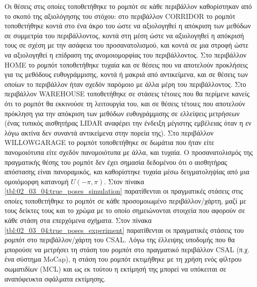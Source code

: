 Οι θέσεις στις οποίες τοποθετήθηκε το ρομπότ σε κάθε περιβάλλον καθορίστηκαν
από το σκοπό της αξιολόγησης του στόχου: στο περιβάλλον CORRIDOR το ρομπότ
τοποθετήθηκε κοντά στο ένα άκρο του ώστε να αξιολογηθεί η απόκριση των μεθόδων
σε συμμετρία του περιβάλλοντος, κοντά στη μέση ώστε να αξιολογηθεί η απόκρισή
τους σε σχέση με την ασάφεια του προσανατολισμού, και κοντά σε μια στροφή ώστε
να αξιολογηθεί η επίδραση της ανομοιομορφίας του περιβάλλοντος. Στο περιβάλλον
HOME το ρομπότ τοποθετήθηκε τυχαία και σε θέσεις που να αποτελούν προκλήσεις
για τις μεθόδους ευθυγράμμισης, κοντά ή μακριά από αντικείμενα, και σε θέσεις
των οποίων το περιβάλλον ήταν σχεδόν παρόμοιο με άλλα μέρη του περιβάλλοντος.
Στο περιβάλλον WAREHOUSE τοποθετήθηκε σε στάσεις τέτοιες που θα περίμενε κανείς
ότι το ρομπότ θα εκκινούσε τη λειτουργία του, και σε θέσεις τέτοιες που
αποτελούν πρόκληση για την απόκριση των μεθόδων ευθυγράμμισης σε ελλείψεις
μετρήσεων (ένας τυπικός αισθητήρας LIDAR αναφέρει την ένδειξη μέγιστης
εμβέλειας όταν η εν λόγω ακτίνα δεν συναντά αντικείμενα στην πορεία της). Στο
περιβάλλον WILLOWGARAGE το ρομπότ τοποθετήθηκε σε δωμάτια που ήταν είτε
πανομοιότυπα είτε σχεδόν πανομοιότυπα με άλλα, και τυχαία. Ο προσανατολισμός
της πραγματικής θέσης του ρομπότ δεν έχει σημασία δεδομένου ότι ο αισθητήρας
απόστασης είναι πανοραμικός, και καθορίστηκε τυχαία μέσω δειγματοληψίας από μια
ομοιόμορφη κατανομή $U(-\pi,\pi)$. Στον πίνακα
\ref{tbl:02_03_04:true_poses_simulation} παρατίθενται οι πραγματικές στάσεις
στις οποίες τοποθετήθηκε το ρομπότ σε κάθε προσομοιωμένο περιβάλλον/χάρτη, μαζί
με τους δείκτες τους και το χρώμα με το οποίο σημειώνονται στοιχεία που αφορούν
σε κάθε στάση στα επερχόμενα σχήματα.  Στον πίνακα
\ref{tbl:02_03_04:true_poses_experiment} παρατίθενται οι πραγματικές στάσεις
του ρομπότ στο περιβάλλον/χάρτη του CSAL. Λόγω της έλλειψης υποδομής που θα
μπορούσε να μετρήσει τη στάση του ρομπότ στο πραγματικό περιβάλλον CSAL (π.χ.
ένα σύστημα MoCap), η στάση του ρομπότ εκτιμήθηκε με τη χρήση ενός φίλτρου
σωματιδίων (MCL) και ως εκ τούτου η εκτίμησή της μπορεί να υπόκειται σε
αναπόφευκτα σφάλματα εκτίμησης.

